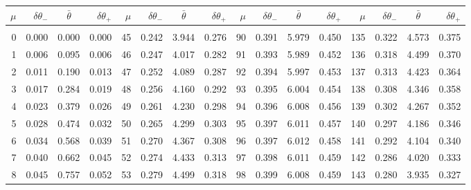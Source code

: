 \clearpage
\begin{table}[!h]\centering
\vspace{0.25cm}
\scriptsize{ 
\begin{tabular}{rrrr|rrrr|rrrr|rrrr}
$\mu$ & $\delta\theta_-$  & $\bar{\theta}~~~~$ & $\delta\theta_+$ &
$\mu$ & $\delta\theta_-$  & $\bar{\theta}~~~~$ & $\delta\theta_+$ &
$\mu$ & $\delta\theta_-$  & $\bar{\theta}~~~~$ & $\delta\theta_+$ &
$\mu$ & $\delta\theta_-$  & $\bar{\theta}~~~~$ & $\delta\theta_+$ \\\hline
&&&&&&&&&&&&&&&\\[-1.75ex]
  0 & \tiny{  0.000} &   0.000 & \tiny{  0.000} &  45 & \tiny{  0.242} &   3.944 & \tiny{  0.276} &  90 & \tiny{  0.391} &   5.979 & \tiny{  0.450} & 135 & \tiny{  0.322} &   4.573 & \tiny{  0.375}\\
  1 & \tiny{  0.006} &   0.095 & \tiny{  0.006} &  46 & \tiny{  0.247} &   4.017 & \tiny{  0.282} &  91 & \tiny{  0.393} &   5.989 & \tiny{  0.452} & 136 & \tiny{  0.318} &   4.499 & \tiny{  0.370}\\
  2 & \tiny{  0.011} &   0.190 & \tiny{  0.013} &  47 & \tiny{  0.252} &   4.089 & \tiny{  0.287} &  92 & \tiny{  0.394} &   5.997 & \tiny{  0.453} & 137 & \tiny{  0.313} &   4.423 & \tiny{  0.364}\\
  3 & \tiny{  0.017} &   0.284 & \tiny{  0.019} &  48 & \tiny{  0.256} &   4.160 & \tiny{  0.292} &  93 & \tiny{  0.395} &   6.004 & \tiny{  0.454} & 138 & \tiny{  0.308} &   4.346 & \tiny{  0.358}\\
  4 & \tiny{  0.023} &   0.379 & \tiny{  0.026} &  49 & \tiny{  0.261} &   4.230 & \tiny{  0.298} &  94 & \tiny{  0.396} &   6.008 & \tiny{  0.456} & 139 & \tiny{  0.302} &   4.267 & \tiny{  0.352}\\
  5 & \tiny{  0.028} &   0.474 & \tiny{  0.032} &  50 & \tiny{  0.265} &   4.299 & \tiny{  0.303} &  95 & \tiny{  0.397} &   6.011 & \tiny{  0.457} & 140 & \tiny{  0.297} &   4.186 & \tiny{  0.346}\\
  6 & \tiny{  0.034} &   0.568 & \tiny{  0.039} &  51 & \tiny{  0.270} &   4.367 & \tiny{  0.308} &  96 & \tiny{  0.397} &   6.012 & \tiny{  0.458} & 141 & \tiny{  0.292} &   4.104 & \tiny{  0.340}\\
  7 & \tiny{  0.040} &   0.662 & \tiny{  0.045} &  52 & \tiny{  0.274} &   4.433 & \tiny{  0.313} &  97 & \tiny{  0.398} &   6.011 & \tiny{  0.459} & 142 & \tiny{  0.286} &   4.020 & \tiny{  0.333}\\
  8 & \tiny{  0.045} &   0.757 & \tiny{  0.052} &  53 & \tiny{  0.279} &   4.499 & \tiny{  0.318} &  98 & \tiny{  0.399} &   6.008 & \tiny{  0.459} & 143 & \tiny{  0.280} &   3.935 & \tiny{  0.327}\\

\end{tabular}}
\end{table}
